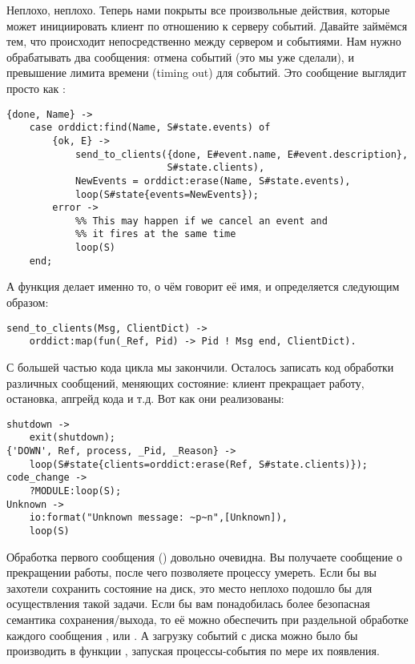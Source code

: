 Неплохо, неплохо.
Теперь нами покрыты все произвольные действия, которые может инициировать клиент по отношению к серверу событий.
Давайте займёмся тем, что происходит непосредственно между сервером и событиями.
Нам нужно обрабатывать два сообщения: отмена событий (это мы уже сделали), и превышение лимита времени (timing out) для событий.
Это сообщение выглядит просто как :
\begin{lstlisting}[style=erlang]
{done, Name} ->
    case orddict:find(Name, S#state.events) of
        {ok, E} ->
            send_to_clients({done, E#event.name, E#event.description},
                            S#state.clients),
            NewEvents = orddict:erase(Name, S#state.events),
            loop(S#state{events=NewEvents});
        error ->
            %% This may happen if we cancel an event and
            %% it fires at the same time
            loop(S)
    end;
\end{lstlisting}

А функция  делает именно то, о чём говорит её имя, и определяется следующим образом:
\begin{lstlisting}[style=erlang]
send_to_clients(Msg, ClientDict) ->
    orddict:map(fun(_Ref, Pid) -> Pid ! Msg end, ClientDict).
\end{lstlisting}

С большей частью кода цикла мы закончили.
Осталось записать код обработки различных сообщений, меняющих состояние: клиент прекращает работу, остановка, апгрейд кода и т.д.
Вот как они реализованы:
\begin{lstlisting}[style=erlang]
shutdown ->
    exit(shutdown);
{'DOWN', Ref, process, _Pid, _Reason} ->
    loop(S#state{clients=orddict:erase(Ref, S#state.clients)});
code_change ->
    ?MODULE:loop(S);
Unknown ->
    io:format("Unknown message: ~p~n",[Unknown]),
    loop(S)
\end{lstlisting}

Обработка первого сообщения () довольно очевидна.
Вы получаете сообщение о прекращении работы, после чего позволяете процессу умереть.
Если бы вы захотели сохранить состояние на диск, это место неплохо подошло бы для осуществления такой задачи.
Если бы вам понадобилась более безопасная семантика сохранения/выхода, то её можно обеспечить при раздельной обработке каждого сообщения ,  или .
А загрузку событий с диска можно было бы производить в функции , запуская процессы\--события по мере их появления.

